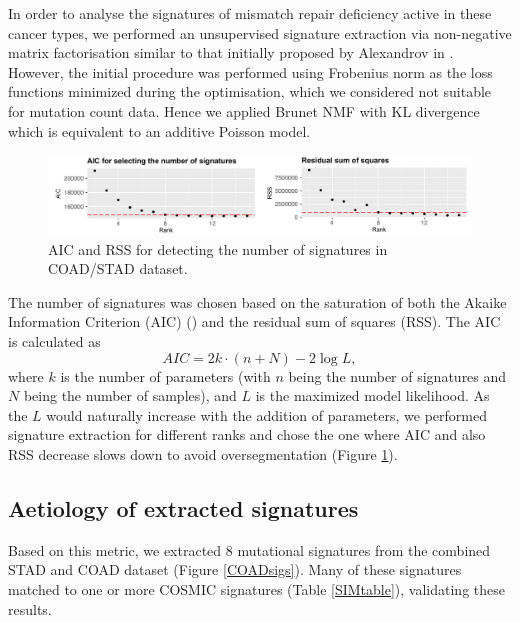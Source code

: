 In order to analyse the signatures of mismatch repair deficiency active in these cancer types, 
we performed an unsupervised signature extraction via non-negative matrix factorisation similar 
to that initially proposed by Alexandrov in \cite{Alexandrov2013-md}. However, the initial procedure was 
performed using Frobenius norm as the loss functions minimized during the optimisation, which 
we considered not suitable for mutation count data. Hence we applied Brunet NMF with KL 
divergence \cite{Brunet2004-fm} which is equivalent to an additive Poisson model.

\begin{figure}[h]
  \centering
  \centerline{\includegraphics[width=1\textwidth]{figures/AIC_and_RSS.png}}
  \caption{AIC and RSS for detecting the number of signatures in COAD/STAD dataset.}
  \label{AIC_and_RSS}
\end{figure}


The number of signatures was chosen based on the saturation of both the Akaike 
Information Criterion (AIC) (\cite{Akaike1992-br}) and the residual sum of squares (RSS). 
The AIC is calculated as 
\[AIC = 2k \cdot (n + N) - 2\log L,\] 
where $k$ is the number of parameters (with $n$ being the number of signatures and $N$ 
being the number of samples), and $L$ is the maximized model likelihood. As the $L$ would 
naturally increase with the addition of parameters, we performed signature extraction for 
different ranks and chose the one where AIC and also RSS decrease slows down to avoid 
oversegmentation (Figure \ref{AIC_and_RSS}).


\subsection{Aetiology of extracted signatures}

Based on this metric, we extracted 8 mutational signatures from the combined STAD and COAD dataset
(Figure \ref{COADsigs}). Many of these signatures matched to one or more COSMIC signatures 
(Table \ref{SIMtable}), validating these results.

